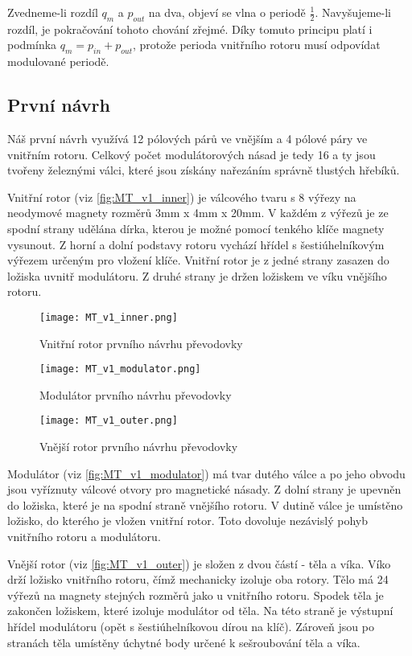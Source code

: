 Zvedneme-li rozdíl $q_m$ a $p_{out}$ na dva, objeví se vlna o periodě $\frac{1}{2}$. Navyšujeme-li rozdíl, je pokračování tohoto chování zřejmé. Díky tomuto principu platí i podmínka $q_m = p_{in} + p_{out}$, protože perioda vnitřního rotoru musí odpovídat modulované periodě.

\subsection{První návrh}

Náš první návrh využívá 12 pólových párů ve vnějším a 4 pólové páry ve vnitřním rotoru. Celkový počet modulátorových násad je tedy 16 a ty jsou tvořeny železnými válci, které jsou získány nařezáním správně tlustých hřebíků.

Vnitřní rotor (viz \autoref{fig:MT_v1_inner}) je válcového tvaru s 8 výřezy na neodymové magnety rozměrů 3mm x 4mm x 20mm. V každém z výřezů je ze spodní strany udělána dírka, kterou je možné pomocí tenkého klíče magnety vysunout. Z horní a dolní podstavy rotoru vychází hřídel s šestiúhelníkovým výřezem určeným pro vložení klíče. Vnitřní rotor je z jedné strany zasazen do ložiska uvnitř modulátoru. Z druhé strany je držen ložiskem ve víku vnějšího rotoru.

\begin{wrapfigure}{r}{0.4\textwidth}
    \texttt{[image: MT\_v1\_inner.png]}
    \centering
    \caption{Vnitřní rotor prvního návrhu převodovky}
    \label{fig:MT_v1_inner}

    \texttt{[image: MT\_v1\_modulator.png]}
    \centering
    \caption{Modulátor prvního návrhu převodovky}
    \label{fig:MT_v1_modulator}

    \texttt{[image: MT\_v1\_outer.png]}
    \centering
    \caption{Vnější rotor prvního návrhu převodovky}
    \label{fig:MT_v1_outer}
\end{wrapfigure}
Modulátor (viz \autoref{fig:MT_v1_modulator}) má tvar dutého válce a po jeho obvodu jsou vyříznuty válcové otvory pro magnetické násady. Z dolní strany je upevněn do ložiska, které je na spodní straně vnějšího rotoru. V dutině válce je umístěno ložisko, do kterého je vložen vnitřní rotor. Toto dovoluje nezávislý pohyb vnitřního rotoru a modulátoru.

Vnější rotor (viz \autoref{fig:MT_v1_outer}) je složen z dvou částí - těla a víka. Víko drží ložisko vnitřního rotoru, čímž mechanicky izoluje oba rotory. Tělo má 24 výřezů na magnety stejných rozměrů jako u vnitřního rotoru. Spodek těla je zakončen ložiskem, které izoluje modulátor od těla. Na této straně je výstupní hřídel modulátoru (opět s šestiúhelníkovou dírou na klíč). Zároveň jsou po stranách těla umístěny úchytné body určené k sešroubování těla a víka.

